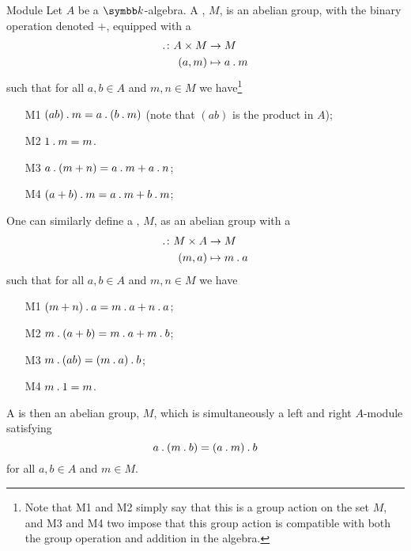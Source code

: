 \begin{dfn}{Module}{}
    Let \(A\) be a \(\field\)-algebra.
    A , \(M\), is an abelian group, with the binary operation denoted \(+\), equipped with a 
    \begin{align}
        \mathbin{.} \colon A \times M &\to M\\
        (a, m) &\mapsto a \mathbin{.} m
    \end{align}
    such that for all \(a, b \in A\) and \(m, n \in M\) we have\footnote{Note that M1 and M2 simply say that this is a group action on the set \(M\), and M3 and M4 two impose that this group action is compatible with both the group operation and addition in the algebra.}
    \begin{itemize}
        \item[M1] \((ab)\mathbin{.} m = a\mathbin{.} (b\mathbin{.} m)\) (note that \((ab)\) is the product in \(A\));
        \item[M2] \(1 \mathbin{.} m = m\).
        \item[M3] \(a\mathbin{.}(m + n) = a\mathbin{.} m + a\mathbin{.} n\);
        \item[M4] \((a + b)\mathbin{.} m = a\mathbin{.} m + b\mathbin{.} m\);
    \end{itemize}
    
    One can similarly define a , \(M\), as an abelian group with a 
    \begin{align}
        \mathbin{.} \colon M \times A &\to M\\
        (m, a) &\mapsto m \mathbin{.} a
    \end{align}
    such that for all \(a, b \in A\) and \(m, n \in M\) we have
    \begin{itemize}
        \item[M1] \((m + n) \mathbin{.} a = m \mathbin{.} a + n \mathbin{.} a\);
        \item[M2] \(m \mathbin{.} (a + b) = m \mathbin{.} a + m \mathbin{.} b\);
        \item[M3] \(m \mathbin{.} (ab) = (m \mathbin{.} a) \mathbin{.} b\);
        \item[M4] \(m \mathbin{.} 1 = m\).
    \end{itemize}
    
    A  is then an abelian group, \(M\), which is simultaneously a left and right \(A\)-module satisfying
    \begin{equation}
        a \mathbin{.} (m \mathbin{.} b) = (a \mathbin{.} m) \mathbin{.} b
    \end{equation}
    for all \(a, b \in A\) and \(m \in M\).
\end{dfn}

